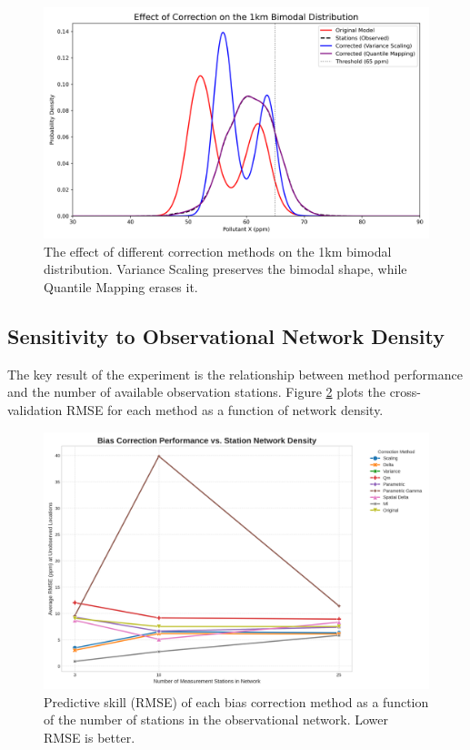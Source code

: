 \documentclass[11pt, a4paper]{article}
\begin{document}
\begin{figure}[h!]
\centering
\includegraphics[width=\textwidth]{distribution_comparison_report.png}
\caption{The effect of different correction methods on the 1km bimodal distribution. Variance Scaling preserves the bimodal shape, while Quantile Mapping erases it.}
\label{fig:dist_report}
\end{figure}

\subsection{Sensitivity to Observational Network Density}
The key result of the experiment is the relationship between method performance and the number of available observation stations. Figure \ref{fig:sensitivity_analysis} plots the cross-validation RMSE for each method as a function of network density.

\begin{figure}[h!]
\centering
\includegraphics[width=\textwidth]{scenario_analysis.png}
\caption{Predictive skill (RMSE) of each bias correction method as a function of the number of stations in the observational network. Lower RMSE is better.}
\label{fig:sensitivity_analysis}
\end{figure}
\end{document}
